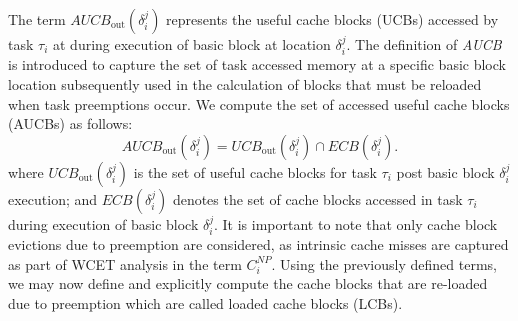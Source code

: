 \noindent The term \begin{math}\textit{AUCB}_{\textrm{out}}(\delta_{i}^{j})\end{math} represents the useful cache blocks (UCBs) accessed by task \begin{math}\tau_{i}\end{math} at during execution of basic block at location \begin{math}\delta_{i}^{j}\end{math}. The definition of \textit{AUCB} is introduced to capture the set of task accessed memory at a specific basic block location subsequently used in the calculation of blocks that must be reloaded when task preemptions occur.  We compute the set of accessed useful cache blocks (AUCBs) as follows:
\begin{equation}\label{eqn:aucb-formula}
    \textit{AUCB}_{\textrm{out}}(\delta_{i}^{j}) = \textit{UCB}_{\textrm{out}}(\delta_{i}^{j}) \cap \textit{ECB}(\delta_{i}^{j}).
\end{equation}
\noindent where \begin{math}\textit{UCB}_{\textrm{out}}(\delta_{i}^{j})\end{math} is the set of useful cache blocks for task \begin{math}\tau_{i}\end{math} post basic block \begin{math}\delta_{i}^{j}\end{math} execution; and \begin{math}\textit{ECB}(\delta_{i}^{j})\end{math} denotes the set of cache blocks accessed in task \begin{math}\tau_{i}\end{math} during execution of basic block \begin{math}\delta_{i}^{j}\end{math}. It is important to note that only cache block evictions due to preemption are considered, as intrinsic cache misses are captured as part of WCET analysis in the term \begin{math}C_{i}^{NP}\end{math}.  Using the previously defined terms, we may now define and explicitly compute the cache blocks that are re-loaded due to preemption which are called loaded cache blocks (LCBs).

